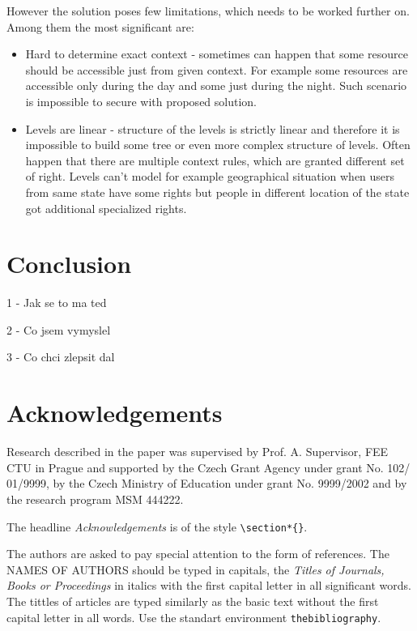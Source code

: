\documentclass{poster15}
\begin{document}
However the solution poses few limitations, which needs to be worked further on. Among them the most significant are:
\begin{itemize}
  \item Hard to determine exact context - sometimes can happen that some resource should be accessible just from given context. For example some resources are accessible only during the day and some just during the night. Such scenario is impossible to secure with proposed solution.
  
  \item Levels are linear - structure of the levels is strictly linear and therefore it is impossible to build some tree or even more complex structure of levels. Often happen that there are multiple context rules, which are granted different set of right. Levels can't model for example geographical situation when users from same state have some rights but people in different location of the state got additional specialized rights.
\end{itemize}

\section{Conclusion}

1 - Jak se to ma ted

2 - Co jsem vymyslel

3 - Co chci zlepsit dal

\section*{Acknowledgements}
Research described in the paper was supervised by Prof. A. Supervisor, FEE CTU in Prague and supported by the Czech Grant Agency under grant No. 102/ 01/9999, by the Czech Ministry of Education under grant No. 9999/2002 and by the research program MSM 444222.

The headline \emph{Acknowledgements} is of the  style \verb+\section*{}+.

The authors are asked to pay special attention to the form of references. The NAMES OF AUTHORS should be typed in capitals, the \emph{Titles of Journals, Books or Proceedings} in italics with the first capital letter in all significant words. The tittles of articles are typed similarly as the basic text without the first capital letter in all words. Use the standart environment \verb+thebibliography+.
\end{document}

